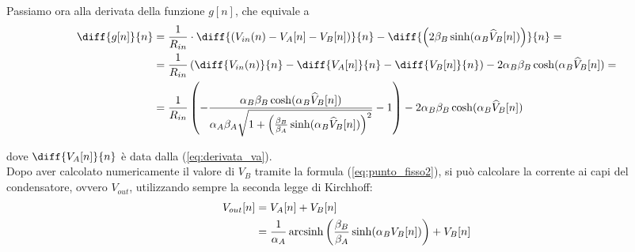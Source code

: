 		Passiamo ora alla derivata della funzione $g[n]$, che equivale a
		\begin{equation}
			\begin{split}
				\diff{g[n]}{n} &= \frac{1}{R_{in}}\cdot\diff{\left(V_{in}(n)-V_{A}[n]-V_{B}[n]\right)}{n}-\diff{\left(2\beta_{B}\sinh(\alpha_{B}\widehat V_{B}[n])\right)}{n} =\\
				&= \frac{1}{R_{in}}\left(\diff{V_{in}(n)}{n}-\diff{V_{A}[n]}{n}-\diff{V_{B}[n]}{n}\right)-2\alpha_{B}\beta_{B}\cosh(\alpha_{B}\widehat V_{B}[n]) =\\
				&= \frac{1}{R_{in}}\left(-\frac{\alpha_{B}\beta_{B}\cosh(\alpha_{B}\widehat V_{B}[n])}{\alpha_{A}\beta_{A}\sqrt{1+\left(\frac{\beta_{B}}{\beta_{A}}\sinh(\alpha_{B}\widehat V_{B}[n])\right)^{2}}}-1\right)-2\alpha_{B}\beta_{B}\cosh(\alpha_{B}\widehat V_{B}[n])
			\end{split}
		\end{equation}
		\vspace{-8px}
		
		\noindent dove $\diff{V_{A}[n]}{n}$ è data dalla (\ref{eq:derivata_va}).\\
		
		Dopo aver calcolato numericamente il valore di $V_{B}$ tramite la formula (\ref{eq:punto_fisso2}), si può calcolare la corrente ai capi del condensatore, ovvero $V_{out}$, utilizzando sempre la seconda legge di Kirchhoff:
		\begin{equation}
			\label{eq:tensione_finale}
			\begin{split}
				V_{out}[n] &= V_{A}[n]+V_{B}[n]\\
				&= \frac{1}{\alpha_{A}} \operatorname{arcsinh} \left(\frac{\beta_{B}}{\beta_{A}} \sinh(\alpha_{B}V_{B}[n])\right)+V_{B}[n]
			\end{split}
		\end{equation}
